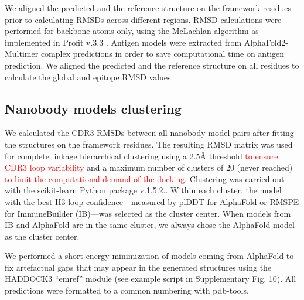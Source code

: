 \documentclass[12pt]{article}
\begin{document}
We aligned the predicted and the reference structure on the framework residues prior to calculating RMSDs across different regions. RMSD calculations were performed for backbone atoms only, using the McLachlan algorithm \cite{mclachlan1982rapid} as implemented in Profit v.3.3 \cite{martin2009profit}.
Antigen models were extracted from AlphaFold2-Multimer complex predictions in order to save computational time on antigen prediction. We aligned the predicted and the reference structure on all residues to calculate the global and epitope RMSD values.

\subsection{Nanobody models clustering}

We calculated the CDR3 RMSDs between all nanobody model pairs after fitting the structures on the framework residues. The resulting RMSD matrix was used for complete linkage hierarchical clustering using a 2.5Å threshold \textcolor{Red}{to ensure CDR3 loop variability} and a maximum number of clusters of 20 (never reached) \textcolor{Red}{to limit the computational demand of the docking}. Clustering was carried out with the scikit-learn Python package v.1.5.2.\cite{pedregosa2011scikit}. Within each cluster, the model with the best H3 loop confidence—measured by plDDT for AlphaFold or RMSPE for ImmuneBuilder (IB)—was selected as the cluster center. When models from IB and AlphaFold are in the same cluster, we always chose the AlphaFold model as the cluster center.

We performed a short energy minimization of models coming from AlphaFold to fix artefactual gaps that may appear in the generated structures using the HADDOCK3 \cite{giulini2025haddock3} “emref” module (see example script in Supplementary Fig. 10). All predictions were formatted to a common numbering with pdb-tools.
\end{document}
